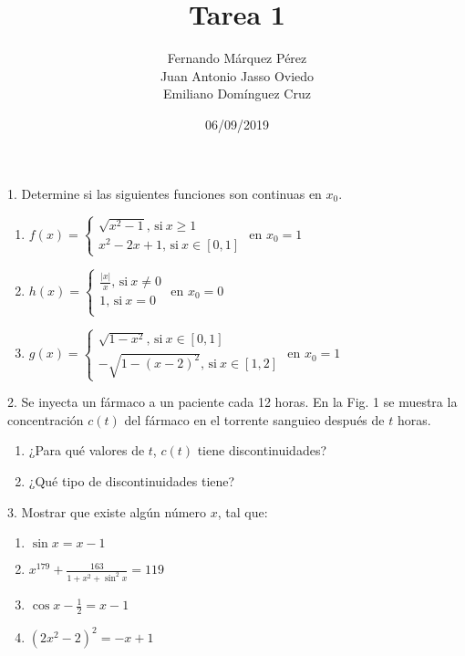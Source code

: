 \documentclass[12pt]{article}
\title{Tarea 1}
\author{Fernando Márquez Pérez \\ Juan Antonio Jasso Oviedo \\ Emiliano Dom\'inguez Cruz}
\date{06/09/2019}
\affil{Facultad de Ciencias\\UNAM}
\begin{document}
\begin{titlepage}
    \maketitle
\end{titlepage}

1. Determine si las siguientes funciones son continuas en \(x_0\).

\begin{enumerate}[\hspace{12px} a)]
    \item
    \( f(x)=
    \begin{cases}
        \sqrt{x^2-1}\text{, si} \ x \geq 1\\
        x^2-2x+1\text{, si} \ x \in [0,1]
    \end{cases}
    \)
    en $x_0 = 1$\\
    \item
    \( h(x)=
    \begin{cases}
        \frac{|x|}{x}\text{, si} \ x \neq 0\\
        1\text{, si} \ x=0\\
    \end{cases}
    \)
    en $x_0=0$
    \item
    \( g(x)=
    \begin{cases}
        \sqrt{1-x^2}\text{, si} \ x \in [0,1]\\
        -\sqrt{1-(x-2)^2}\text{, si} \ x \in [1,2]
    \end{cases}
    \)
    en $x_0=1$
\end{enumerate}

2. Se inyecta un fármaco a un paciente cada 12 horas. En la Fig. 1 se muestra la concentración $c(t)$ del fármaco en el torrente sanguieo después de $t$ horas.

\begin{enumerate}[\hspace{12px} a)]
    \item ¿Para qué valores de $t$, $c(t)$ tiene discontinuidades?
    \item ¿Qué tipo de discontinuidades tiene?
\end{enumerate}

3. Mostrar que existe algún número $x$, tal que:

\begin{enumerate}[\hspace{12px} a)]
    \item \(\sin x = x-1\)
    \item \(x^{179}+\displaystyle\frac{163}{1+x^2+\sin^2 x}=119\)
    \item \(\cos x - \displaystyle\frac{1}{2}=x-1\)
    \item \((2x^2-2)^2=-x+1\)
\end{enumerate}
\end{document}
